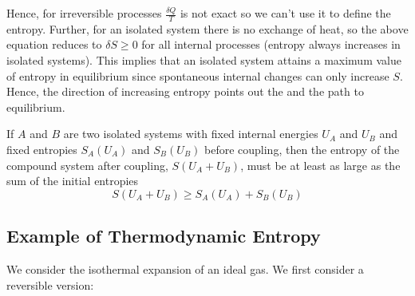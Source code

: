 \documentclass[12pt, a4paper, oneside, openright, titlepage]{book}
\begin{document}
Hence, for irreversible processes $\frac{\delta Q}{T}$ is not exact so we can't use it to define the entropy. Further, for an isolated system there is no exchange of heat, so the above equation reduces to $\delta S \geq 0$ for all internal processes (entropy always increases in isolated systems). This implies that an isolated system attains a maximum value of entropy in equilibrium since spontaneous internal changes can only increase $S$. Hence, the direction of increasing entropy points out the  and the path to equilibrium.

\begin{law}
    If $A$ and $B$ are two isolated systems with fixed internal energies $U_A$ and $U_B$ and fixed entropies $S_A(U_A)$ and $S_B(U_B)$ before coupling, then the entropy of the compound system after coupling, $S(U_A+U_B)$, must be at least as large as the sum of the initial entropies \begin{equation*}
        S(U_A+U_B) \geq S_A(U_A) + S_B(U_B)
    \end{equation*}
\end{law}


\subsection{Example of Thermodynamic Entropy}

We consider the isothermal expansion of an ideal gas. We first consider a reversible version:
\end{document}
